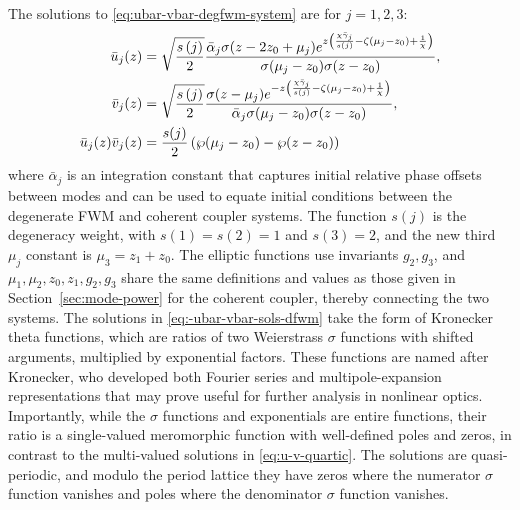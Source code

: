 \documentclass[11pt,a4paper]{article}
\numberwithin{equation}{section}
\begin{document}
The solutions to \eqref{eq:ubar-vbar-degfwm-system} are for $j=1,2,3$:
\begin{align}
\bar{u}_j{\left(z\right)} &= \sqrt{\frac{s\left(j\right)}{2}}\frac{{\bar{\alpha}}_{j}\sigma{\left(z - 2 z_{0} + {\mu}_{j}\right)} e^{z \left(\frac{\chi {\bar{\gamma}}_{j}}{s{\left(j \right)}} - \zeta{\left({\mu}_{j} - z_{0}\right)} + \frac{1}{\chi}\right)}}{\sigma{\left({\mu}_{j} - z_{0}\right)} \sigma{\left(z - z_{0}\right)  }}, \notag \\
\bar{v}_j{\left(z\right)} &= \sqrt{\frac{s\left(j\right)}{2}}\frac{\sigma{\left(z - {\mu}_{j}\right)} e^{- z \left(\frac{\chi {\bar{\gamma}}_{j}}{s{\left(j \right)}} - \zeta{\left({\mu}_{j} - z_{0}\right)} + \frac{1}{\chi}\right)}}{{\bar{\alpha}}_{j} \sigma{\left({\mu}_{j} - z_{0}\right)} \sigma{\left(z - z_{0}\right)} }, \notag \\
\bar{u}_j{\left(z\right)} \bar{v}_j{\left(z\right)} &= \frac{s{\left(j \right)}}{2}\left(\wp{\left({\mu}_{j} - z_{0} \right)} - \wp{\left(z - z_{0}\right)}\right) \label{eq:-ubar-vbar-sols-dfwm}
\end{align}
where $\bar{\alpha}_j$ is an integration constant that captures initial relative phase offsets between modes and can be used to equate initial conditions between the degenerate FWM and coherent coupler systems. 
The function $s(j)$ is the degeneracy weight, with $s(1)=s(2)=1$ and $s(3)=2$, and the new third $\mu_j$ constant is $\mu_3 = z_1 + z_0$. The elliptic functions use invariants $g_2, g_3$, and $\mu_1, \mu_2, z_0, z_1, g_2, g_3$ share the same definitions and values as those given in Section~\ref{sec:mode-power} for the coherent coupler, thereby connecting the two systems. 
The solutions in \eqref{eq:-ubar-vbar-sols-dfwm} take the form of Kronecker theta functions, which are ratios of two Weierstrass $\sigma$ functions with shifted arguments, multiplied by exponential factors.
These functions are named after Kronecker, who developed both Fourier series \cite{whittakerCourseModernAnalysis2021} and multipole-expansion \cite{weilEllipticFunctionsAccording1976, charolloisEllipticFunctionsAccording2016} representations that may prove useful for further analysis in nonlinear optics.
Importantly, while the $\sigma$ functions and exponentials are entire functions, their ratio is a single-valued meromorphic function with well-defined poles and zeros, in contrast to the multi-valued solutions in \eqref{eq:u-v-quartic}.
The solutions are quasi-periodic, and modulo the period lattice they have zeros where the numerator $\sigma$ function vanishes and poles where the denominator $\sigma$ function vanishes.
\end{document}
